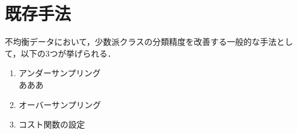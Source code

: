 \section{既存手法}

不均衡データにおいて，少数派クラスの分類精度を改善する一般的な手法として，以下の3つが挙げられる．

\begin{enumerate}
    \item アンダーサンプリング \\
    あああ
    \item オーバーサンプリング\\
    \item コスト関数の設定\\
\end{enumerate}
